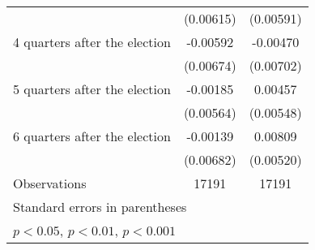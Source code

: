 \begin{table}[htbp]
\begin{tabular}{l*{2}{c}}
                    &   (0.00615)         &   (0.00591)         \\
[1em]
 4 quarters after the election&    -0.00592         &    -0.00470         \\
                    &   (0.00674)         &   (0.00702)         \\
[1em]
 5 quarters after the election&    -0.00185         &     0.00457         \\
                    &   (0.00564)         &   (0.00548)         \\
[1em]
 6 quarters after the election&    -0.00139         &     0.00809         \\
                    &   (0.00682)         &   (0.00520)         \\
\hline
Observations        &       17191         &       17191         \\
\hline\hline
\multicolumn{3}{l}{\footnotesize Standard errors in parentheses}\\
\multicolumn{3}{l}{\footnotesize \sym{*} \(p<0.05\), \sym{**} \(p<0.01\), \sym{***} \(p<0.001\)}\\
\end{tabular}
\end{table}
